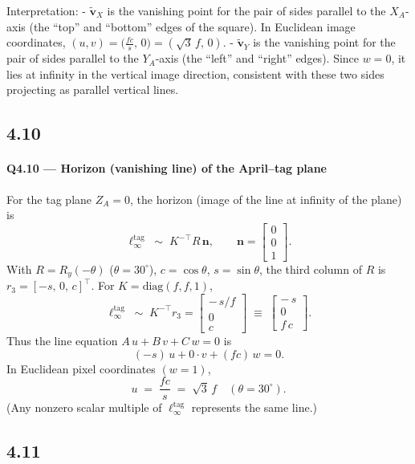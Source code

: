 \documentclass[12pt]{article}
\begin{document}
Interpretation:
- \(\tilde{\mathbf{v}}_X\) is the vanishing point for the pair of sides parallel to the \(X_A\)-axis
  (the “top” and “bottom” edges of the square). In Euclidean image coordinates,
  \((u,v) = \big(\tfrac{f c}{s},\,0\big) = (\sqrt{3}\,f,\,0)\).
- \(\tilde{\mathbf{v}}_Y\) is the vanishing point for the pair of sides parallel to the \(Y_A\)-axis
  (the “left” and “right” edges). Since \(w=0\), it lies at infinity in the vertical
  image direction, consistent with these two sides projecting as parallel vertical lines.


\subsection*{4.10}
\paragraph{Q4.10 — Horizon (vanishing line) of the April–tag plane}
For the tag plane \(Z_A=0\), the horizon (image of the line at infinity of the plane)
is
\[
\ell_\infty^\text{tag} \;\sim\; K^{-\top} R\,\mathbf{n},\qquad
\mathbf{n}=\begin{bmatrix}0\\0\\1\end{bmatrix}.
\]
With \(R=R_y(-\theta)\) (\(\theta=30^\circ\)), \(c=\cos\theta\), \(s=\sin\theta\),
the third column of \(R\) is \(r_3=[-s,\,0,\,c]^\top\). For
\(K=\mathrm{diag}(f,f,1)\),
\[
\boxed{\;
\ell_\infty^\text{tag} \;\sim\; K^{-\top} r_3
= \begin{bmatrix} -\,s/f \\[2pt] 0 \\[2pt] c \end{bmatrix}
\;\equiv\; \begin{bmatrix} -\,s \\[2pt] 0 \\[2pt] f\,c \end{bmatrix}.
\;}
\]
Thus the line equation \(A\,u + B\,v + C\,w=0\) is
\[
(-s)\,u + 0\cdot v + (f c)\,w = 0.
\]
In Euclidean pixel coordinates \((w=1)\),
\[
\boxed{\; u \;=\; \dfrac{f c}{s} \;=\; \sqrt{3}\,f \quad(\theta=30^\circ). \;}
\]
(Any nonzero scalar multiple of \(\ell_\infty^\text{tag}\) represents the same line.)

\subsection*{4.11}
\end{document}
